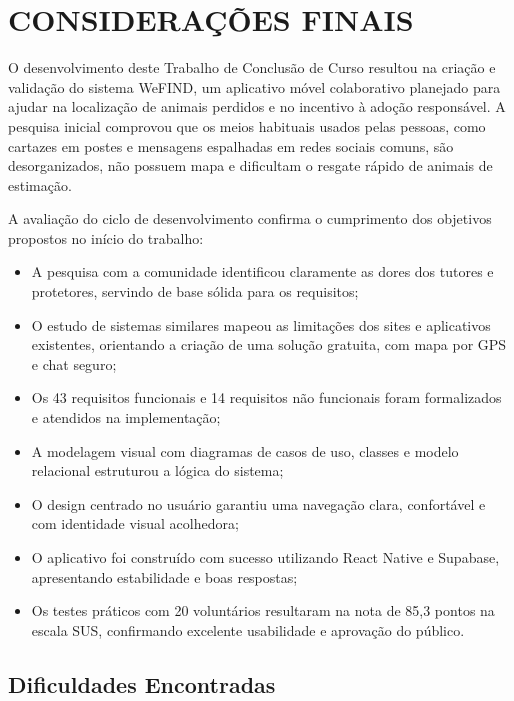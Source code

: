 \section{CONSIDERAÇÕES FINAIS}

O desenvolvimento deste Trabalho de Conclusão de Curso resultou na criação e validação do sistema WeFIND, um aplicativo móvel colaborativo planejado para ajudar na localização de animais perdidos e no incentivo à adoção responsável. A pesquisa inicial comprovou que os meios habituais usados pelas pessoas, como cartazes em postes e mensagens espalhadas em redes sociais comuns, são desorganizados, não possuem mapa e dificultam o resgate rápido de animais de estimação.

A avaliação do ciclo de desenvolvimento confirma o cumprimento dos objetivos propostos no início do trabalho:
\begin{itemize}
    \item A pesquisa com a comunidade identificou claramente as dores dos tutores e protetores, servindo de base sólida para os requisitos;
    \item O estudo de sistemas similares mapeou as limitações dos sites e aplicativos existentes, orientando a criação de uma solução gratuita, com mapa por GPS e chat seguro;
    \item Os 43 requisitos funcionais e 14 requisitos não funcionais foram formalizados e atendidos na implementação;
    \item A modelagem visual com diagramas de casos de uso, classes e modelo relacional estruturou a lógica do sistema;
    \item O design centrado no usuário garantiu uma navegação clara, confortável e com identidade visual acolhedora;
    \item O aplicativo foi construído com sucesso utilizando React Native e Supabase, apresentando estabilidade e boas respostas;
    \item Os testes práticos com 20 voluntários resultaram na nota de 85,3 pontos na escala SUS, confirmando excelente usabilidade e aprovação do público.
\end{itemize}

\subsection{Dificuldades Encontradas}


